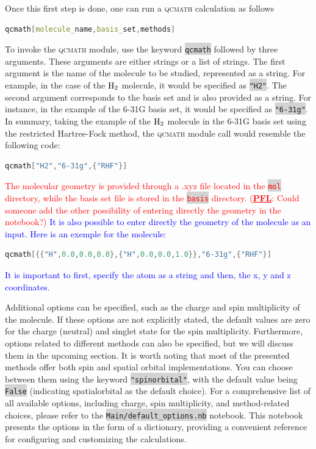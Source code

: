 \documentclass[aip,jcp,reprint,noshowkeys,superscriptaddress]{revtex4-1}
\newcommand{\titou}[1]{\textcolor{red}{#1}}
\newcommand{\enzo}[1]{\textcolor{blue}{#1}}
\newcommand{\PFL}[1]{\titou{(\underline{\bf PFL}: #1)}}
\newcommand{\qcmath}{\textsc{qcmath}\xspace}
\newcommand{\keyword}[1]{{\colorbox{lightgray}{\texttt{#1}}}}
\begin{document}
Once this first step is done, one can run a \qcmath calculation as follows
\begin{lstlisting}[extendedchars=true,language=Mathematica]
	qcmath[molecule_name,basis_set,methods]
\end{lstlisting}
To invoke the \qcmath module, use the keyword \keyword{qcmath} followed by three arguments. These arguments are either strings or a list of strings. The first argument is the name of the molecule to be studied, represented as a string. For example, in the case of the $\ce{H2}$ molecule, it would be specified as \keyword{"H2"}. The second argument corresponds to the basis set and is also provided as a string. For instance, in the example of the 6-31G basis set, it would be specified as \keyword{"6-31g"}. In summary, taking the example of the $\ce{H2}$ molecule in the 6-31G basis set using the restricted Hartree-Fock method, the \qcmath module call would resemble the following code:
\begin{lstlisting}[extendedchars=true,language=Mathematica]
	qcmath["H2","6-31g",{"RHF"}]
\end{lstlisting}
\titou{The molecular geometry is provided through a .xyz file located in the \keyword{mol} directory, while the basis set file is stored in the \keyword{basis} directory.} 
\PFL{Could someone add the other possibility of entering directly the geometry in the notebook?}
\enzo{It is also possible to enter directly the geometry of the molecule as an input. Here is an exemple for the \ce{H2} molecule:}
\begin{lstlisting}[extendedchars=true,language=Mathematica]
	qcmath[{{"H",0.0,0.0,0.0},{"H",0.0,0.0,1.0}},"6-31g",{"RHF"}]
\end{lstlisting}
\enzo{It is important to first, specify the atom as a string and then, the x, y and z coordinates.}

Additional options can be specified, such as the charge and spin multiplicity of the molecule. If these options are not explicitly stated, the default values are zero for the charge (neutral) and singlet state for the spin multiplicity.
Furthermore, options related to different methods can also be specified, but we will discuss them in the upcoming section. It is worth noting that most of the presented methods offer both spin and spatial orbital implementations. You can choose between them using the keyword \keyword{"spinorbital"}, with the default value being \keyword{False} (indicating spatialorbital as the default choice).
For a comprehensive list of all available options, including charge, spin multiplicity, and method-related choices, please refer to the \keyword{Main/default\_options.nb} notebook. This notebook presents the options in the form of a dictionary, providing a convenient reference for configuring and customizing the calculations.
\end{document}

